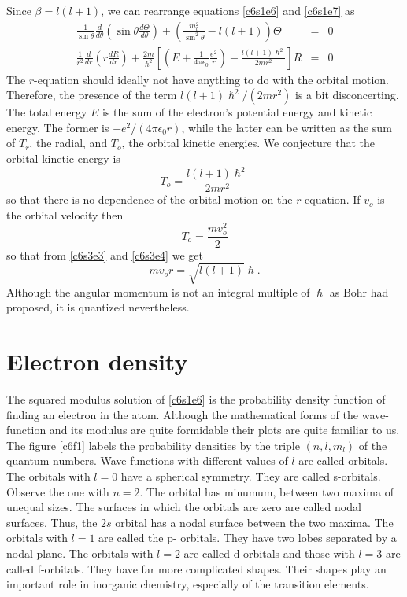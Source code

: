 Since $\beta = l(l+1)$, we can rearrange equations \eqref{c6s1e6} and 
\eqref{c6s1e7} as 
\begin{eqnarray}
\frac{1}{\sin\theta}\frac{d}{d\theta}
\left(\sin\theta\frac{d\Theta}{d\theta}\right) + 
\left(\frac{m_l^2}{\sin^2\theta} - l(l+1)\right)\Theta &=& 0 \label{c6s3e1} \\
\frac{1}{r^2}\frac{d}{dr}\left(r\frac{dR}{dr}\right) + \frac{2m}{\hslash^2}
\left[\left(E + \frac{1}{4\pi\epsilon_0}\frac{e^2}{r}\right)
- \frac{l(l+1)\hslash^2}{2mr^2}\right]R &=& 0 \label{c6s3e2}
\end{eqnarray}
The $r$-equation should ideally not have anything to do with the orbital motion.
Therefore, the presence of the term $l(l+1)\hslash^2/(2mr^2)$ is a bit 
disconcerting. The total energy $E$ is the sum of the electron's potential
energy and kinetic energy. The former is $-e^2/(4\pi\epsilon_0 r)$, while the 
latter can be written as the sum of $T_r$, the radial, and $T_o$, the orbital
kinetic energies. We conjecture that the orbital kinetic energy is
\begin{equation}\label{c6s3e3}
T_o = \frac{l(l+1)\hslash^2}{2mr^2}
\end{equation}
so that there is no dependence of the orbital motion on the $r$-equation. If
$v_o$ is the orbital velocity then 
\begin{equation}\label{c6s3e4}
T_o = \frac{mv_o^2}{2}
\end{equation}
so that from \eqref{c6s3e3} and \eqref{c6s3e4} we get
\begin{equation}\label{c6s3e5}
mv_or = \sqrt{l(l+1)}\hslash.
\end{equation}
Although the angular momentum is not an integral multiple of $\hslash$ as Bohr
had proposed, it is quantized nevertheless.

\section{Electron density}\label{c6s4}
The squared modulus solution of \eqref{c6s1e6} is the probability density 
function of finding an electron in the atom. Although the mathematical forms 
of the wave-function and its modulus are quite formidable their plots are quite
familiar to us. The figure \ref{c6f1} labels the probability densities by the
triple $(n, l, m_l)$ of the quantum numbers. Wave functions with different 
values of $l$ are called orbitals. The orbitals with $l = 0$ have a spherical 
symmetry.  They are called s-orbitals. Observe the one with $n=2$. The orbital 
has minumum, between two maxima of unequal sizes. The surfaces in which the 
orbitals are zero are called nodal surfaces. Thus, the $2s$ orbital has a nodal 
surface between the two maxima. The orbitals with $l = 1$ are called the p-
orbitals. They have two lobes separated by a nodal plane. The orbitals with 
$l = 2$ are called d-orbitals and those with $l = 3$ are called f-orbitals. 
They have far more complicated shapes. Their shapes play an important role in 
inorganic chemistry, especially of the transition elements.

